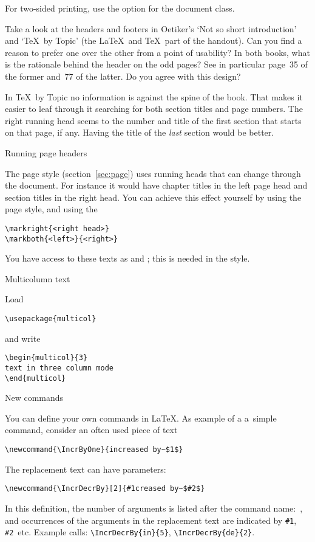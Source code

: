 For two-sided printing, use the  option for the
document class.

\begin{594exercise}
Take a look at the headers and footers in Oetiker's `Not so short
introduction' and `\TeX\ by Topic' (the \LaTeX\ and \TeX\ part
of the handout). Can you find a reason to prefer one over the other
from a point of usability?
In both books, what is the rationale behind the header on the odd
pages? See in particular page~35 of the former and~77 of the
latter. Do you agree with this design?
\end{594exercise}
\begin{answer}
In \TeX\ by Topic no information is against the spine of the
book. That makes it easier to leaf through it searching for both
section titles and page numbers.
The right running head seems to the number and title of the first
section that starts on that page, if any. Having the title of the
\emph{last} section would be better.
\end{answer}

 {Running page headers}
\label{sec:running-head}

The  page style (section~\ref{sec:page}) uses running
heads that can change through the document. For instance it would have
chapter titles in the left page head and section titles in the right
head. You can achieve this effect yourself by using the 
page style, and using the 
\begin{verbatim}
\markright{<right head>}
\markboth{<left>}{<right>}
\end{verbatim}
You have access to these texts as  and
; this is needed in the  style.

 {Multicolumn text}

Load 
\begin{verbatim}
\usepackage{multicol}
\end{verbatim}
and write
\begin{verbatim}
\begin{multicol}{3}
text in three column mode
\end{multicol}
\end{verbatim}

 {New commands}
\label{sec:newcommand}

You can define your own commands in \LaTeX. As example of a a~simple
command, consider an often used piece of text
\begin{verbatim}
\newcommand{\IncrByOne}{increased by~$1$}
\end{verbatim}
The replacement text can have parameters:
\begin{verbatim}
\newcommand{\IncrDecrBy}[2]{#1creased by~$#2$}
\end{verbatim}
In this definition, the number of arguments is listed after the
command name:~\n{[2]}, and occurrences of the arguments in the
replacement text are indicated by \verb+#1+, \verb+#2+~etc. Example
calls: \verb+\IncrDecrBy{in}{5}+, \verb+\IncrDecrBy{de}{2}+.


